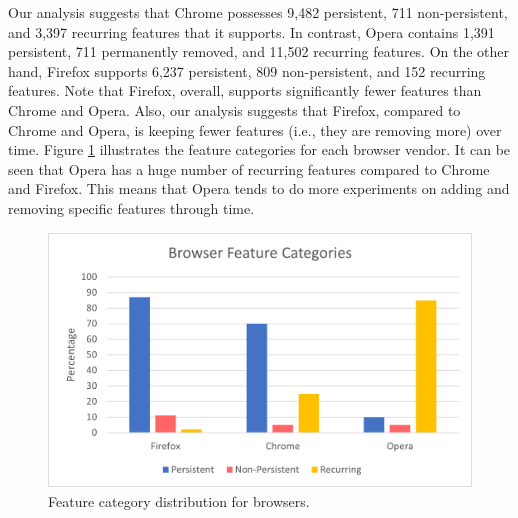 Our analysis suggests that Chrome possesses 9,482 persistent, 711
non-persistent, and 3,397 recurring features that it supports. In contrast,
Opera contains 1,391 persistent, 711 permanently removed, and 11,502 recurring
features. On the other hand, Firefox supports 6,237 persistent, 809 non-persistent, and
152 recurring features. Note that Firefox, overall, supports significantly fewer
features than Chrome and Opera. Also, our analysis suggests that Firefox,
compared to Chrome and Opera, is keeping fewer features (i.e., they are removing
more) over time. Figure \ref{fig:feature-categories} illustrates the feature categories for
each browser vendor. It can be seen that Opera has a huge number of recurring features
compared to Chrome and Firefox. This means that Opera tends to do more experiments
on adding and removing specific features through time.

\begin{figure}[ht]
  \centering
  \includegraphics[width=.9\columnwidth]{figures/feature-categories-bar.png}
  \caption{Feature category distribution for browsers.}
  \label{fig:feature-categories}
\end{figure}





